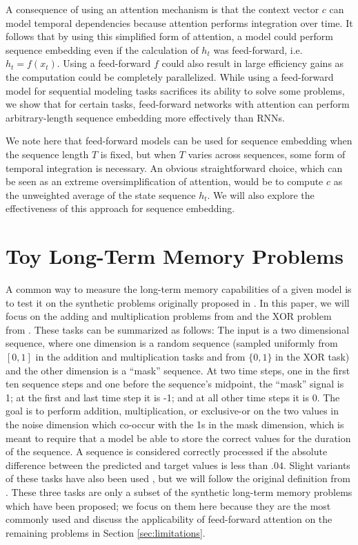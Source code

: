 \documentclass{article} %
\begin{document}
A consequence of using an attention mechanism is that the context vector $c$ can model temporal dependencies because attention performs integration over time.
It follows that by using this simplified form of attention, a model could perform sequence embedding even if the calculation of $h_t$ was feed-forward, i.e.\ $h_t = f(x_t)$.
Using a feed-forward $f$ could also result in large efficiency gains as the computation could be completely parallelized.
While using a feed-forward model for sequential modeling tasks sacrifices its ability to solve some problems, we show that for certain tasks, feed-forward networks with attention can perform arbitrary-length sequence embedding more effectively than RNNs.

We note here that feed-forward models can be used for sequence embedding when the sequence length $T$ is fixed, but when $T$ varies across sequences, some form of temporal integration is necessary.
An obvious straightforward choice, which can be seen as an extreme oversimplification of attention, would be to compute $c$ as the unweighted average of the state sequence $h_t$.
We will also explore the effectiveness of this approach for sequence embedding.

\section{Toy Long-Term Memory Problems}

A common way to measure the long-term memory capabilities of a given model is to test it on the synthetic problems originally proposed in \cite{hochreiter1997long}.
In this paper, we will focus on the adding and multiplication problems from \cite{hochreiter1997long} and the XOR problem from \cite{martens2011learning}.
These tasks can be summarized as follows:
The input is a two dimensional sequence, where one dimension is a random sequence (sampled uniformly from $[0, 1]$ in the addition and multiplication tasks and from $\{0, 1\}$ in the XOR task) and the other dimension is a ``mask'' sequence.
At two time steps, one in the first ten sequence steps and one before the sequence's midpoint, the ``mask'' signal is 1; at the first and last time step it is -1; and at all other time steps it is 0.
The goal is to perform addition, multiplication, or exclusive-or on the two values in the noise dimension which co-occur with the 1s in the mask dimension, which is meant to require that a model be able to store the correct values for the duration of the sequence.
A sequence is considered correctly processed if the absolute difference between the predicted and target values is less than $.04$.
Slight variants of these tasks have also been used \cite{sutskever2013importance,le2015simple,jaegar2012long,martens2011learning}, but we will follow the original definition from \cite{hochreiter1997long}.
These three tasks are only a subset of the synthetic long-term memory problems which have been proposed; we focus on them here because they are the most commonly used and discuss the applicability of feed-forward attention on the remaining problems in Section \ref{sec:limitations}.
\end{document}
